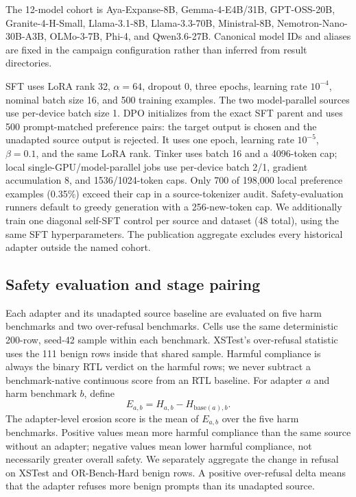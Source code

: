 \documentclass[letterpaper]{article}
\newcommand{\CampaignMaxNewTokens}{256}
\begin{document}
The 12-model cohort is Aya-Expanse-8B, Gemma-4-E4B/31B, GPT-OSS-20B,
Granite-4-H-Small, Llama-3.1-8B, Llama-3.3-70B, Ministral-8B,
Nemotron-Nano-30B-A3B, OLMo-3-7B, Phi-4, and Qwen3.6-27B. Canonical model IDs and
aliases are fixed in the campaign configuration rather than inferred from result directories.

SFT uses LoRA rank 32, $\alpha=64$, dropout 0, three epochs, learning rate
$10^{-4}$, nominal batch size 16, and 500 training examples. The two model-parallel
sources use per-device batch size 1. DPO initializes from
the exact SFT parent and uses 500 prompt-matched preference pairs: the target output is
chosen and the unadapted source output is rejected. It uses one epoch, learning rate
$10^{-5}$, $\beta=0.1$, and the same LoRA rank. Tinker uses batch 16 and a 4096-token
cap; local single-GPU/model-parallel jobs use per-device batch 2/1, gradient accumulation
8, and 1536/1024-token caps. Only 700 of 198,000 local preference examples (0.35\%)
exceed their cap in a source-tokenizer audit. Safety-evaluation runners default to greedy generation with a
\CampaignMaxNewTokens-new-token cap. We additionally train one diagonal self-SFT control
per source and dataset (48 total), using the same SFT hyperparameters. The publication
aggregate excludes every historical adapter outside the named cohort.

\subsection{Safety evaluation and stage pairing}

Each adapter and its unadapted source baseline are evaluated on five harm benchmarks
and two over-refusal benchmarks. Cells use the same deterministic 200-row, seed-42
sample within each benchmark. XSTest's over-refusal statistic uses the 111 benign rows
inside that shared sample. Harmful compliance is always the binary RTL verdict on the
harmful rows; we never subtract a benchmark-native continuous score from an RTL
baseline. For adapter $a$ and harm benchmark $b$, define
\[
E_{a,b}=H_{a,b}-H_{\mathrm{base}(a),b}.
\]
The adapter-level erosion score is the mean of $E_{a,b}$ over the five harm benchmarks.
Positive values mean more harmful compliance than the same source without an adapter;
negative values mean lower harmful compliance, not necessarily greater overall safety.
We separately aggregate the change in refusal on XSTest and OR-Bench-Hard benign rows.
A positive over-refusal delta means that the adapter refuses more benign prompts than
its unadapted source.
\end{document}
